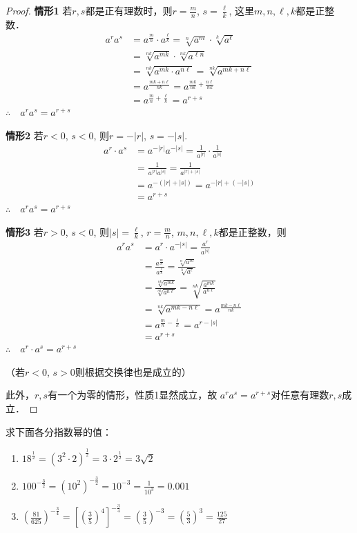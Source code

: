 \begin{proof}
\textbf{情形1 } 若$r,s$都是正有理数时，则$r=\frac{m}{n}$, $s=\frac{\ell}{k}$, 
这里$m,n,\ell,k$都是正整数．
\[\begin{split}
a^r a^s&= a^{\tfrac{m}{n}}\cdot a^{\tfrac{\ell}{k}} =\sqrt[n]{a^m}\cdot \sqrt[k]{a^{\ell}}\\
&=\sqrt[nk]{a^{mk}}\cdot \sqrt[nk]{a^{\ell n}}\\
&=\sqrt[nk]{a^{mk}\cdot a^{n\ell}}=\sqrt[nk]{a^{mk+n\ell}}\\
&=a^{\tfrac{mk+n\ell}{nk}}=a^{\tfrac{mk}{nk}+\tfrac{n\ell}{nk}}\\
&=a^{\tfrac{m}{n}+\tfrac{\ell}{k}}=a^{r+s}
\end{split}\]
$\therefore\quad a^r a^s=a^{r+s}$

\textbf{情形2 } 若$r<0$, $s<0$, 则$r=-|r|$, $s=-|s|$.
\[\begin{split}
a^r\cdot a^s &= a^{-|r|}a^{-|s|}=\frac{1}{a^{|r|}}\cdot \frac{1}{a^{|s|}}\\
&=\frac{1}{a^{|r|}a^{|s|}}=\frac{1}{a^{|r|+|s|}}\\
&=a^{-(|r|+|s|)}=a^{-|r|+(-|s|)}\\
&=a^{r+s}
\end{split}\]
$\therefore\quad a^r a^s=a^{r+s}$


\textbf{情形3 } 若$r>0$, $s<0$, 则$|s|=\frac{\ell}{k}$, $r=\frac{m}{n}$, 
$m,n,\ell,k$都是正整数，则
\[\begin{split}
a^r a^s&=a^r\cdot  a^{-|s|}=\frac{a^r}{a^{|s|}}\\
&=\frac{a^{\tfrac{m}{n}}}{a^{\tfrac{\ell}{k}}}=\frac{\sqrt[n]{a^m}}{\sqrt[k]{a^{\ell}}}\\
&=\frac{\sqrt[nk]{a^{mk}}}{\sqrt[nk]{a^{n\ell}}}=\sqrt[nk]{\frac{a^{mk}}{a^{n\ell}}}\\
&=\sqrt[nk]{a^{mk-n\ell}}=a^{\tfrac{mk-n\ell}{nk}}\\
&=a^{\tfrac{m}{n}-\tfrac{\ell}{k}}=a^{r-|s|}\\
&=a^{r+s}
\end{split}\]
$\therefore\quad a^r\cdot  a^s=a^{r+s}$

（若$r<0$, $s>0$则根据交换律也是成立的）

此外，$r,s$有一个为零的情形，性质1显然成立，故
$a^ra^s=a^{r+s}$对任意有理数$r,s$成立．
\end{proof}

\begin{example}
求下面各分指数幂的值：
\begin{enumerate}
\item $18^{\tfrac{1}{2}}=\left(3^2\cdot 2\right)^{\tfrac{1}{2}}=3\cdot 2^{\tfrac{1}{2}}=3\sqrt{2}$
\item $100^{-\tfrac{3}{2}}=(10^2)^{-\tfrac{3}{2}}=10^{-3}=\frac{1}{10^3}=0.001$
\item $\left(\frac{81}{625}\right)^{-\tfrac{3}{4}}=\left[\left(\frac{3}{5}\right)^4\right]^{-\tfrac{3}{4}}=\left(\frac{3}{5}\right)^{-3}=\left(\frac{5}{3}\right)^3=\frac{125}{27}$
\end{enumerate}
\end{example}
    
